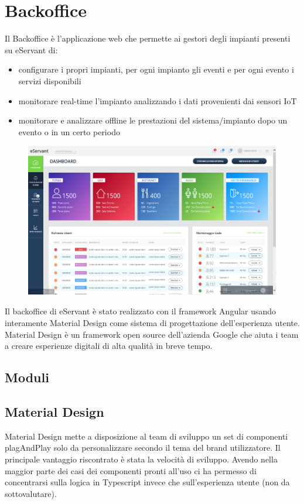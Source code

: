 \chapter{Backoffice}
Il Backoffice è l'applicazione web che permette ai gestori degli impianti presenti su eServant di:
\begin{itemize}
    \item configurare i propri impianti, per ogni impianto gli eventi e per ogni evento i servizi disponibili
    \item monitorare real-time l'impianto analizzando i dati provenienti dai sensori IoT
    \item monitorare e analizzare offline le prestazioni del sistema/impianto dopo un evento o in un certo periodo
\end{itemize}

\begin{figure}[H]
    \centering  
    \includegraphics[scale=0.5]{img/cap3/backoffice}
\end{figure}

Il backoffice di eServant è stato realizzato con il framework Angular usando interamente Material Design come
sistema di progettazione dell'esperienza utente.
Material Design è un framework open source dell'azienda Google che aiuta i team a creare esperienze digitali
di alta qualità in breve tempo.

\section{Moduli}

\section{Material Design}
Material Design mette a disposizione al team di sviluppo un set di componenti plagAndPlay solo da personalizzare
secondo il tema del brand utilizzatore.
Il principale vantaggio riscontrato è stata la velocità di sviluppo. Avendo nella maggior parte dei
casi dei componenti pronti all'uso ci ha permesso di concentrarsi sulla logica in Typescript invece che
sull'esperienza utente (non da sottovalutare).\\


